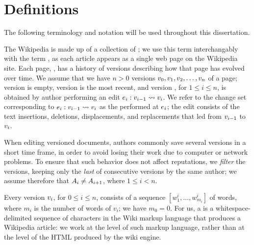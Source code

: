 
\chapter{Definitions}
\label{ch:defs}

The following terminology and notation
will be used throughout this dissertation.

The Wikipedia is made up of a collection of ;
we use this term interchangably with the term ,
as each article appears as a single web page on the Wikipedia site.
Each page, \page{}, has a history of versions describing how that
page has evolved over time.
We assume that we have $n > 0$ versions
$v_{0}, v_{1}, v_{2}, \ldots, v_{n}$
of a page;
version  is empty, version  is the most recent,
and version , for $1 \leq i \leq n$,
is obtained by author  performing an
edit $e_{i}: v_{i-1} \rightsquigarrow v_{i}$.
We refer to the change set corresponding to
$e_{i}: v_{i-1} \rightsquigarrow v_{i}$
as the  performed at $e_{i}$; the edit consists of the text
insertions, deletions, displacements, and replacements that led from
$v_{i-1}$ to $v_{i}$.

When editing versioned documents, authors commonly save several
versions in a short time frame, in order to avoid losing their work
due to computer or network problems.
To ensure that such behavior does not affect reputations, we
\textit{filter} the versions, keeping only the \textit{last} of consecutive
versions by the same author; we assume therefore that
$A_{i} \neq A_{i+1}$,
where $1 \leq i < n$.

Every version $v_{i}$, for $0 \leq i \leq n$, consists of a sequence
$[w^i_1, \ldots, w^i_{m_i}]$ of words, where $m_i$ is the number of
words of $v_i$; we have $m_0 = 0$.
For us, a  is a whitespace-delimited sequence of
characters in the Wiki markup language that produces a Wikipedia article:
we work at the level of such markup language, rather than at the level
of the HTML produced by the wiki engine.

